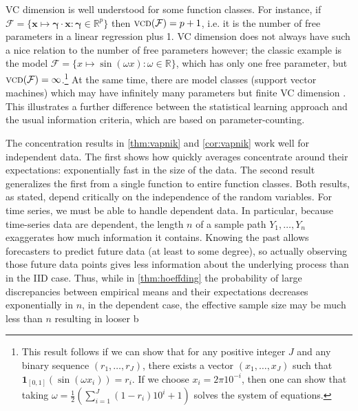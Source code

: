 \documentclass{article}
\theoremstyle{plain}
\newcommand{\F}{\mathcal{F}}
\newcommand{\R}{\mathbb{R}}
\newcommand{\bs}[1]{\boldsymbol{#1}}
\DeclareMathOperator*{\vcd}{\textsc{vcd}}
\newcommand{\indicator}{\mathbf{1}}
\begin{document}
VC dimension is well understood for some function classes. For instance, if
$\F=\{\mathbf{x}\mapsto \bs{\gamma}\cdot\mathbf{x} : \bs{\gamma} \in \R^p\}$
then $\vcd(\F)=p+1$, i.e. it is the number of free parameters in a linear
regression plus 1.  VC dimension does not always have such a nice relation to
the number of free parameters however; the classic example is the model
$\F=\{x\mapsto \sin(\omega x) : \omega \in \R\}$, which has only one free
parameter, but $\vcd(\F)=\infty$.\footnote{This result follows if we can show
  that for any positive integer $J$ and any binary sequence $(r_1,\ldots,r_J)$,
  there exists a vector $(x_1,\ldots,x_J)$ such that
  $\indicator_{[0,1]}(\sin(\omega x_i))=r_i$. If we choose $x_i=2\pi 10^{-i}$,
  then one can show that taking $\omega=\frac{1}{2}\left(\sum_{i=1}^J
    (1-r_i)10^i +1\right)$ solves the system of equations.}  At the
same time, there are model classes (support vector machines) which may
have infinitely many parameters but finite VC dimension
\citep{CristianiniShawe-Taylor2000}. This illustrates a further
difference between the statistical learning approach and the usual information
criteria, which are based on parameter-counting.

The concentration results in \autoref{thm:vapnik} and \autoref{cor:vapnik} work
well for independent data. The first shows how quickly averages concentrate around
their expectations: exponentially fast in the size of the data.  The second
result generalizes the first from a single function to entire function classes.
Both results, as stated, depend critically on the independence of the random
variables.  For time series, we must be able to handle dependent data.  In
particular, because time-series data are dependent, the length $n$ of
a sample
path $Y_1,\ldots,Y_n$ exaggerates how much information it contains.  Knowing
the past allows forecasters to predict future data (at least to some degree),
so actually observing those future data points gives less information about the
underlying process than in the IID case. Thus, while in \autoref{thm:hoeffding}
the probability of large discrepancies between empirical means and their
expectations decreases exponentially in $n$, in the dependent case, the
effective sample size may be much less than $n$ resulting in looser b
\end{document}
